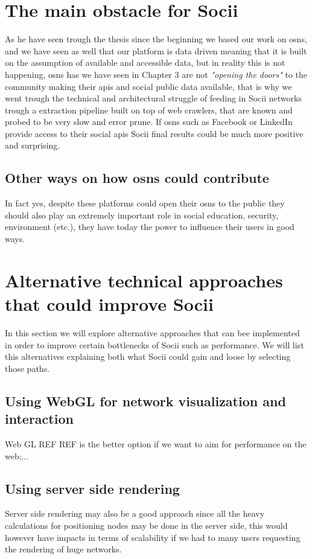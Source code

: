 \section{The main obstacle for Socii}
As he have seen trough the thesis since the beginning we based our work on \glspl{osn}, and we have seen as well that our platform is data driven meaning that it is built on the assumption of available and accessible data, but in reality this is not happening, \glspl{osn} has we have seen in Chapter 3 are not \textit{"opening the doors"} to the community making their \glspl{api} and social public data available, that is why we went trough the technical and architectural struggle of feeding in Socii networks trough a extraction pipeline built on top of web crawlers, that are known and probed to be very slow and error prune. If \glspl{osn} such as Facebook or LinkedIn provide access to their social \glspl{api} Socii final results could be much more positive and surprising.

\subsection*{Other ways on how \glspl{osn} could contribute}
In fact yes, despite these platforms could open their \glspl{osn} to the public they should also play an extremely important role in social education, security, environment (etc.), they have today the power to influence their users in good ways.

\section{Alternative technical approaches that could improve Socii}
In this section we will explore alternative approaches that can bee implemented in order to improve certain bottlenecks of Socii such as performance. We will list this alternatives explaining both what Socii could gain and loose by selecting those paths.

\subsection{Using WebGL for network visualization and interaction}
Web GL REF REF is the better option if we want to aim for performance on the web;...

\subsection{Using server side rendering}
Server side rendering may also be a good approach since all the heavy calculations for positioning nodes
may be done in the server side, this would however have impacts in terms of scalability if we had to many users requesting
the rendering of huge networks.

